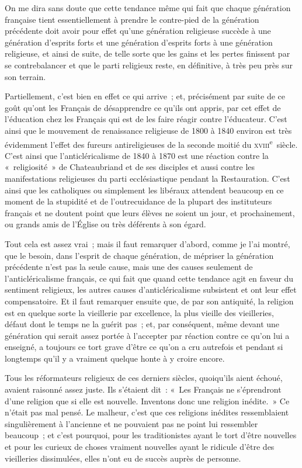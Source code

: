 \documentclass[french,twoside]{book} %
\begin{document}
\noindent On me dira sans doute que cette tendance même qui fait que chaque génération française tient essentiellement à prendre le contre-pied de la génération précédente doit avoir pour effet qu’une génération religieuse succède à une génération d’esprits forts et une génération d’esprits forts à une génération religieuse, et ainsi de suite, de telle sorte que les gains et les pertes finissent par se contrebalancer et que le parti religieux reste, en définitive, à très peu près sur son terrain.\par
Partiellement, c’est bien en effet ce qui arrive ; et, précisément par suite de ce goût qu’ont les Français de désapprendre ce qu’ils ont appris, par cet effet de l’éducation chez les Français qui est de les faire réagir contre l’éducateur. C’est ainsi que le mouvement de renaissance religieuse de 1800 à 1840 environ est très évidemment l’effet des fureurs antireligieuses de la seconde moitié du \textsc{xviii}\textsuperscript{e} siècle. C’est ainsi que l’anticléricalisme de 1840 à 1870 est une réaction contre la « religiosité » de Chateaubriand et de ses disciples et aussi contre les manifestations religieuses du parti ecclésiastique pendant la Restauration. C’est ainsi que les catholiques ou simplement les libéraux attendent  beaucoup en ce moment de la stupidité et de l’outrecuidance de la plupart des instituteurs français et ne doutent point que leurs élèves ne soient un jour, et prochainement, ou grands amis de l’Église ou très déférents à son égard.\par
Tout cela est assez vrai ; mais il faut remarquer d’abord, comme je l’ai montré, que le besoin, dans l’esprit de chaque génération, de mépriser la génération précédente n’est pas la seule cause, mais une des causes seulement de l’anticléricalisme français, ce qui fait que quand cette tendance agit en faveur du sentiment religieux, les autres causes d’anticléricalisme subsistent et ont leur effet compensatoire. Et il faut remarquer ensuite que, de par son antiquité, la religion est en quelque sorte la vieillerie par excellence, la plus vieille des vieilleries, défaut dont le temps ne la guérit pas ; et, par conséquent, même devant une génération qui serait assez portée à l’accepter par réaction contre ce qu’on lui a enseigné, a toujours ce tort grave d’être ce qu’on a cru autrefois et pendant si longtemps qu’il y a vraiment quelque honte à y croire encore.\par
Tous les réformateurs religieux de ces derniers siècles, quoiqu’ils aient échoué, avaient raisonné assez juste. Ils s’étaient dit : « Les Français ne s’éprendront d’une religion que si elle est nouvelle.  Inventons donc une religion inédite. » Ce n’était pas mal pensé. Le malheur, c’est que ces religions inédites ressemblaient singulièrement à l’ancienne et ne pouvaient pas ne point lui ressembler beaucoup ; et c’est pourquoi, pour les traditionistes ayant le tort d’être nouvelles et pour les curieux de choses vraiment nouvelles ayant le ridicule d’être des vieilleries dissimulées, elles n’ont eu de succès auprès de personne.\par
\end{document}
